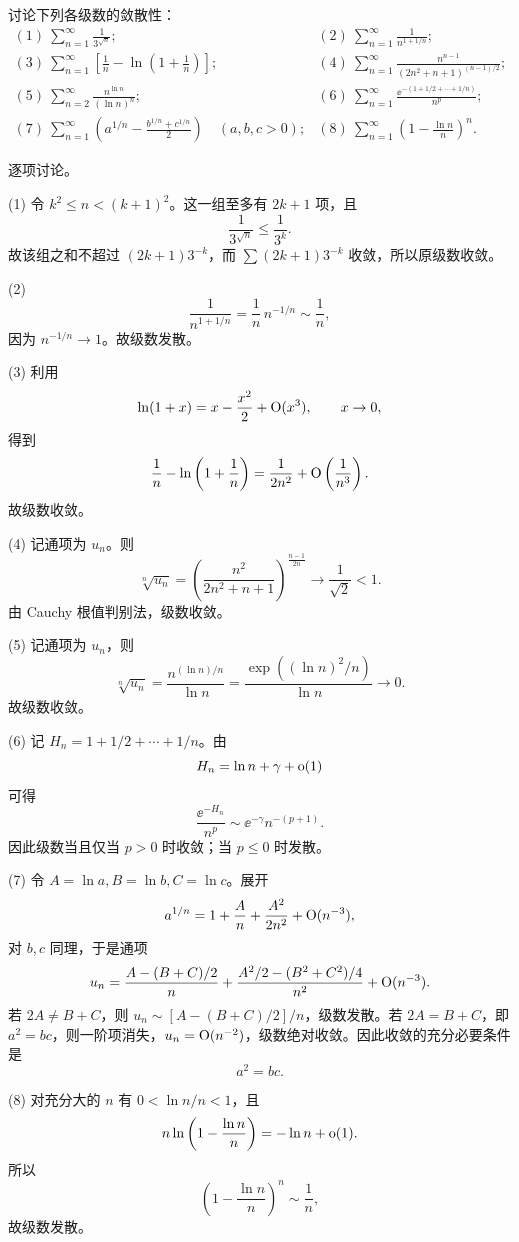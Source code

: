 \begin{xexercise}[3]
讨论下列各级数的敛散性：
\[
\begin{array}{ll}
(1)\ \displaystyle\sum_{n=1}^{\infty}\frac1{3^{\sqrt n}};&
(2)\ \displaystyle\sum_{n=1}^{\infty}\frac1{n^{1+1/n}};\\[6pt]
(3)\ \displaystyle\sum_{n=1}^{\infty}\left[\frac1n-\ln\left(1+\frac1n\right)\right];&
(4)\ \displaystyle\sum_{n=1}^{\infty}\frac{n^{n-1}}{(2n^2+n+1)^{(n-1)/2}};\\[6pt]
(5)\ \displaystyle\sum_{n=2}^{\infty}\frac{n^{\ln n}}{(\ln n)^n};&
(6)\ \displaystyle\sum_{n=1}^{\infty}\frac{\ee^{-(1+1/2+\cdots+1/n)}}{n^p};\\[6pt]
(7)\ \displaystyle\sum_{n=1}^{\infty}\left(a^{1/n}-\frac{b^{1/n}+c^{1/n}}2\right)\quad(a,b,c>0);&
(8)\ \displaystyle\sum_{n=1}^{\infty}\left(1-\frac{\ln n}{n}\right)^n.
\end{array}
\]
\end{xexercise}
\begin{xsolution}
逐项讨论。

(1) 令 $k^2\leq n<(k+1)^2$。这一组至多有 $2k+1$ 项，且
\[
 \frac1{3^{\sqrt n}}\leq\frac1{3^k}.
\]
故该组之和不超过 $(2k+1)3^{-k}$，而 $\sum(2k+1)3^{-k}$ 收敛，所以原级数收敛。

(2)
\[
 \frac1{n^{1+1/n}}=\frac1n\,n^{-1/n}\sim\frac1n,
\]
因为 $n^{-1/n}\to1$。故级数发散。

(3) 利用
\[
 \ln(1+x)=x-\frac{x^2}{2}+\mathrm{O}(x^3),\qquad x\to0,
\]
得到
\[
 \frac1n-\ln\left(1+\frac1n\right)
 =\frac1{2n^2}+\mathrm{O}\left(\frac1{n^3}\right).
\]
故级数收敛。

(4) 记通项为 $u_n$。则
\[
 \sqrt[n]{u_n}
 =\left(\frac{n^2}{2n^2+n+1}\right)^{\frac{n-1}{2n}}
 \longrightarrow\frac1{\sqrt2}<1.
\]
由 Cauchy 根值判别法，级数收敛。

(5) 记通项为 $u_n$，则
\[
 \sqrt[n]{u_n}
 =\frac{n^{(\ln n)/n}}{\ln n}
 =\frac{\exp((\ln n)^2/n)}{\ln n}\longrightarrow0.
\]
故级数收敛。

(6) 记 $H_n=1+1/2+\cdots+1/n$。由
\[
 H_n=\ln n+\gamma+\mathrm{o}(1)
\]
可得
\[
 \frac{\ee^{-H_n}}{n^p}
 \sim \ee^{-\gamma}n^{-(p+1)}.
\]
因此级数当且仅当 $p>0$ 时收敛；当 $p\leq0$ 时发散。

(7) 令 $A=\ln a,B=\ln b,C=\ln c$。展开
\[
 a^{1/n}=1+\frac A n+\frac{A^2}{2n^2}+\mathrm{O}(n^{-3}),
\]
对 $b,c$ 同理，于是通项
\[
 u_n=\frac{A-(B+C)/2}{n}
 +\frac{A^2/2-(B^2+C^2)/4}{n^2}
 +\mathrm{O}(n^{-3}).
\]
若 $2A\neq B+C$，则 $u_n\sim[A-(B+C)/2]/n$，级数发散。若 $2A=B+C$，即 $a^2=bc$，则一阶项消失，$u_n=\mathrm{O}(n^{-2})$，级数绝对收敛。因此收敛的充分必要条件是
\[
 a^2=bc.
\]

(8) 对充分大的 $n$ 有 $0<\ln n/n<1$，且
\[
 n\ln\left(1-\frac{\ln n}{n}\right)
 =-\ln n+\mathrm{o}(1).
\]
所以
\[
 \left(1-\frac{\ln n}{n}\right)^n\sim\frac1n,
\]
故级数发散。
\end{xsolution}


